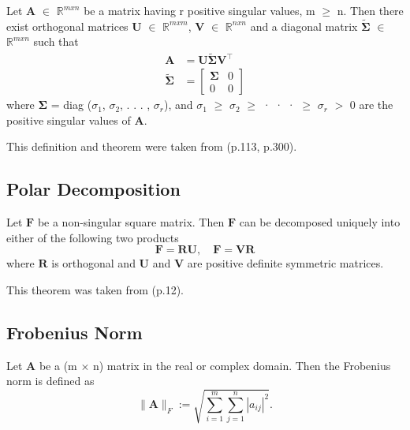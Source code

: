 \begin{theorem}
\label{SVD}
Let $\mathbf{A}$ $\in$ $\mathbb{R}^{m x n}$ be a matrix having r positive singular values, m $\geq$ n. Then there exist orthogonal matrices $\mathbf{U}$ $\in$ $\mathbb{R}^{m x m}$, $\mathbf{V}$ $\in$ $\mathbb{R}^{n x n}$ and a diagonal matrix $\mathbf{\tilde{\Sigma}}$ $\in$ $\mathbb{R}^{m x n}$ such that
\begin{align*}
\mathbf{A} &= \mathbf{U \tilde{\Sigma} V^\intercal} \\
\mathbf{\tilde{\Sigma}} &= \left[ \begin{array}{cc} \mathbf{\Sigma} & 0 \\ 0 & 0 \end{array} \right]
\end{align*}
where $\mathbf{\Sigma}$ = diag ($\sigma_1$, $\sigma_2$, . . . , $\sigma_r$), and $\sigma_1$ $\geq$ $\sigma_2$ $\geq$ · · · $\geq$ $\sigma_r$ $>$ 0 are the positive singular values of $\mathbf{A}$.
\end{theorem}

This definition and theorem were taken from \cite{ford2014numerical} (p.113, p.300).


\subsection{Polar Decomposition}

\begin{theorem}
\label{PD}

Let $\mathbf{F}$ be a non-singular square matrix. Then $\mathbf{F}$ can be decomposed uniquely into either of the following two products
\[
\mathbf{F} = \mathbf{RU}, \quad \mathbf{F} = \mathbf{VR}
\]
where $\mathbf{R}$ is orthogonal and $\mathbf{U}$ and $\mathbf{V}$ are positive definite symmetric matrices.
\end{theorem}

This theorem was taken from \cite{Spencer1980} (p.12).

\subsection{Frobenius Norm}

\begin{definition}
\label{FN}
Let \textbf{A} be a (m $\times$ n) matrix in the real or complex domain. Then the Frobenius norm is defined as 
\[
\| \mathbf{A} \|_{F} := \sqrt{\sum\limits_{i=1}^{m} \sum\limits_{j=1}^{n} |a_{ij}|^2}.
\]
\end{definition}

